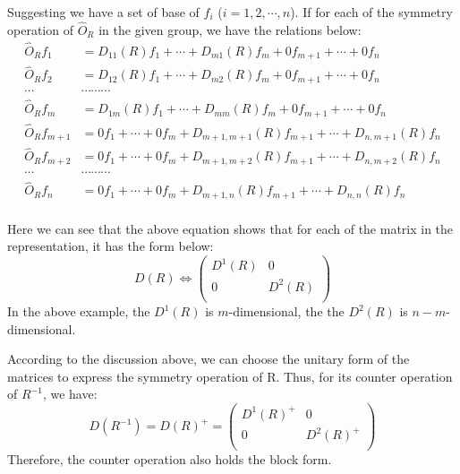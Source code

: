 Suggesting we have a set of base of $f_{i}$ ($i=1,2,\cdots, n$). If
for each of the symmetry operation of $\hat{O}_{R}$ in the given
group, we have the relations below:
\begin{align}\label{}
  \hat{O}_{R}f_{1} &= D_{11}(R)f_{1} + \cdots + D_{m1}(R)f_{m} +
  0f_{m+1} + \cdots + 0f_{n} \nonumber \\
  \hat{O}_{R}f_{2} &= D_{12}(R)f_{1} + \cdots + D_{m2}(R)f_{m} +
  0f_{m+1} + \cdots + 0f_{n} \nonumber \\
  \cdots & \cdots \cdots \cdots \nonumber \\
  \hat{O}_{R}f_{m} &= D_{1m}(R)f_{1} + \cdots + D_{mm}(R)f_{m} +
  0f_{m+1} + \cdots + 0f_{n} \nonumber \\
  \hat{O}_{R}f_{m+1} &= 0f_{1} + \cdots + 0f_{m} +
  D_{m+1, m+1}(R)f_{m+1} + \cdots + D_{n,m+1}(R)f_{n} \nonumber \\
  \hat{O}_{R}f_{m+2} &= 0f_{1} + \cdots + 0f_{m} +
  D_{m+1, m+2}(R)f_{m+1} + \cdots + D_{n,m+2}(R)f_{n} \nonumber \\
  \cdots & \cdots \cdots \cdots \nonumber \\
  \hat{O}_{R}f_{n} &= 0f_{1} + \cdots + 0f_{m} +
  D_{m+1, n}(R)f_{m+1} + \cdots + D_{n,n}(R)f_{n} \nonumber \\
\end{align}

Here we can see that the above equation shows that for each of the
matrix in the representation, it has the form below:
\begin{equation}
  D(R) \Leftrightarrow \left(
    \begin{array}{cc}
      D^{1}(R) & 0        \\
      0        & D^{2}(R) \\
    \end{array}
  \right)
\end{equation}
In the above example, the $D^{1}(R)$ is $m$-dimensional, the the
$D^{2}(R)$ is $n-m$-dimensional.

According to the discussion above, we can choose the unitary form of
the matrices to express the symmetry operation of R. Thus, for its
counter operation of $R^{-1}$, we have:
\begin{equation}\label{}
  D(R^{-1}) = D(R)^{+} =\left(
    \begin{array}{cc}
      D^{1}(R)^{+} & 0        \\
      0        & D^{2}(R)^{+} \\
    \end{array}
  \right)
\end{equation}
Therefore, the counter operation also holds the block form.

